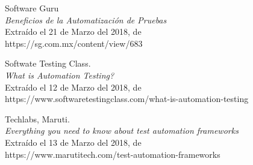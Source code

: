 \begin{thebibliography}{99}
 Software Guru\\ %
\emph{Beneficios de la Automatización de Pruebas}\\
Extraído el 21 de Marzo del 2018, de\\
https://sg.com.mx/content/view/683

 Softwate Testing Class.\\
\emph{What is Automation Testing?}\\
Extraído el 12 de Marzo del 2018, de\\
https://www.softwaretestingclass.com/what-is-automation-testing

 Techlabs, Maruti.\\
\emph{Everything you need to know about test automation frameworks}\\
Extraído el 13 de Marzo del 2018, de\\
https://www.marutitech.com/test-automation-frameworks

\end{thebibliography}

